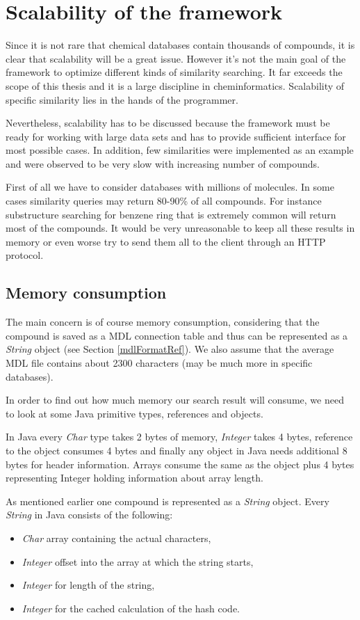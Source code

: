 \documentclass[thesis=M,english]{FITthesis}[2012/10/20]
\begin{document}
\section{Scalability of the framework}
\label{scalabilityRef}
Since it is not rare that chemical databases contain thousands of compounds, it is clear that scalability will be a great issue. However it’s not the main goal of the framework to optimize different kinds of similarity searching. It far exceeds the scope of this thesis and it is a large discipline in cheminformatics. Scalability of specific similarity lies in the hands of the programmer. 

Nevertheless, scalability has to be discussed because the framework must be ready for working with large data sets and has to provide sufficient interface for most possible cases. In addition, few similarities were implemented as an example and were observed to be very slow with increasing number of compounds.

First of all we have to consider databases with millions of molecules. In some cases similarity queries may return 80-90\% of all compounds. For instance substructure searching for benzene ring that is extremely common will return most of the compounds.  It would be very unreasonable to keep all these results in memory or even worse try to send them all to the client through an HTTP protocol. 

\subsection{Memory consumption}
\label{memoryConsumptionRef}
The main concern is of course memory consumption, considering that the compound is saved as a MDL connection table and thus can be represented as a \textit{String} object (see Section \ref{mdlFormatRef}). We also assume that the average MDL file contains about 2300 characters (may be much more in specific databases). 

In order to find out how much memory our search result will consume, we need to look at some Java primitive types, references and objects. 

In Java every \textit{Char} type takes 2 bytes of memory, \textit{Integer} takes 4 bytes, reference to the object consumes 4 bytes and finally any object in Java needs additional 8 bytes for header information. Arrays consume the same as the object plus 4 bytes representing Integer holding information about array length.  

As mentioned earlier one compound is represented as a \textit{String} object. Every \textit{String} in Java consists of the following:
\begin{itemize}
\item \textit{Char} array containing the actual characters,
\item \textit{Integer} offset into the array at which the string starts,
\item \textit{Integer} for length of the string,
\item \textit{Integer} for the cached calculation of the hash code.
\end{itemize}
\end{document}
